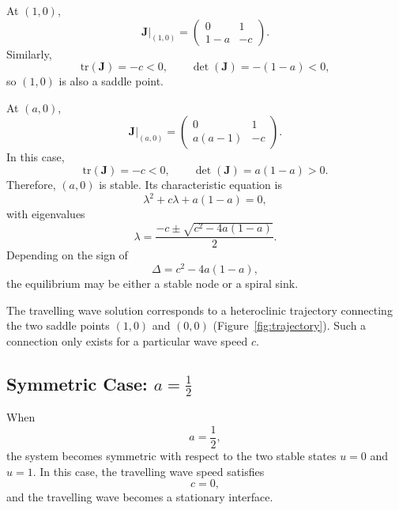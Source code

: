At $(1,0)$,
\begin{equation*}
\mathbf{J}|_{(1,0)}
=
\begin{pmatrix}
0 & 1\\
1-a & -c
\end{pmatrix}.
\end{equation*}
Similarly,
\begin{equation*}
\mathrm{tr}(\mathbf{J})=-c<0,
\qquad
\det(\mathbf{J})=-(1-a)<0,
\end{equation*}
so $(1,0)$ is also a saddle point.

At $(a,0)$,
\begin{equation*}
\mathbf{J}|_{(a,0)}
=
\begin{pmatrix}
0 & 1\\
a(a-1) & -c
\end{pmatrix}.
\end{equation*}
In this case,
\begin{equation*}
\mathrm{tr}(\mathbf{J})=-c<0,
\qquad
\det(\mathbf{J})=a(1-a)>0.
\end{equation*}
Therefore, $(a,0)$ is stable. Its characteristic equation is
\begin{equation*}
\lambda^2+c\lambda+a(1-a)=0,
\end{equation*}
with eigenvalues
\begin{equation*}
\lambda
=
\frac{-c\pm\sqrt{c^2-4a(1-a)}}{2}.
\end{equation*}
Depending on the sign of
\begin{equation*}
\Delta=c^2-4a(1-a),
\end{equation*}
the equilibrium may be either a stable node or a spiral sink.

The travelling wave solution corresponds to a heteroclinic trajectory connecting the two saddle points $(1,0)$ and $(0,0)$ (Figure~\ref{fig:trajectory}). Such a connection only exists for a particular wave speed $c$.

\subsection*{Symmetric Case: $a=\frac12$}

When
\begin{equation*}
a=\frac12,
\end{equation*}
the system becomes symmetric with respect to the two stable states $u=0$ and $u=1$. In this case, the travelling wave speed satisfies
\begin{equation*}
c=0,
\end{equation*}
and the travelling wave becomes a stationary interface.

